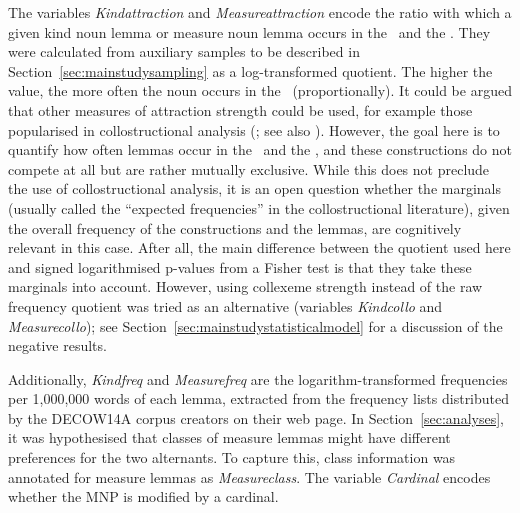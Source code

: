 The variables \textit{Kindattraction} and \textit{Measureattraction} encode the ratio with which a given kind noun lemma or measure noun lemma occurs in the \PGCd\ and the \NACb.
They were calculated from auxiliary samples to be described in Section~\ref{sec:mainstudysampling} as a log-transformed quotient.
The higher the value, the more often the noun occurs in the \PGCd\ (proportionally).
It could be argued that other measures of attraction strength could be used, for example those popularised in collostructional analysis (\citealp{StefanowitschGries2003,GriesStefanowitsch2004}; see also \citealp{Gries2015a}).
However, the goal here is to quantify how often lemmas occur in the \PGCd\ and the \NACb, and these constructions do not compete at all but are rather mutually exclusive.
While this does not preclude the use of collostructional analysis, it is an open question whether the marginals (usually called the ``expected frequencies'' in the collostructional literature), given the overall frequency of the constructions and the lemmas, are cognitively relevant in this case.
After all, the main difference between the quotient used here and signed logarithmised p-values from a Fisher test is that they take these marginals into account. 
However, using collexeme strength instead of the raw frequency quotient was tried as an alternative (variables \textit{Kindcollo} and \textit{Measurecollo}); see Section~\ref{sec:mainstudystatisticalmodel} for a discussion of the negative results.

Additionally, \textit{Kindfreq} and \textit{Measurefreq} are the logarithm-transformed frequencies per 1,000,000 words of each lemma, extracted from the frequency lists distributed by the DECOW14A corpus creators on their web page.
In Section~\ref{sec:analyses}, it was hypothesised that classes of measure lemmas might have different preferences for the two alternants.
To capture this, class information was annotated for measure lemmas as \textit{Measureclass}.
The variable \textit{Cardinal} encodes whether the MNP is modified by a cardinal.

